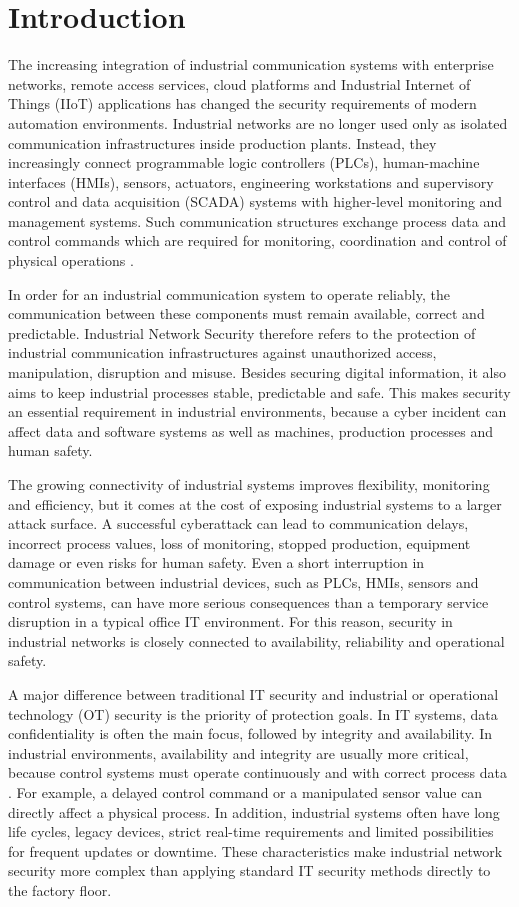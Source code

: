 \documentclass[conference]{IEEEtran}
\begin{document}
\section{Introduction}
The increasing integration of industrial communication systems with enterprise networks, remote access services, cloud platforms and Industrial Internet of Things (IIoT) applications has changed the security requirements of modern automation environments. Industrial networks are no longer used only as isolated communication infrastructures inside production plants. Instead, they increasingly connect programmable logic controllers (PLCs), human-machine interfaces (HMIs), sensors, actuators, engineering workstations and supervisory control and data acquisition (SCADA) systems with higher-level monitoring and management systems. Such communication structures exchange process data and control commands which are required for monitoring, coordination and control of physical operations \cite{b1}. 

In order for an industrial communication system to operate reliably, the communication between these components must remain available, correct and predictable. Industrial Network Security therefore refers to the protection of industrial communication infrastructures against unauthorized access, manipulation, disruption and misuse. Besides securing digital information, it also aims to keep industrial processes stable, predictable and safe. This makes security an essential requirement in industrial environments, because a cyber incident can affect data and software systems as well as machines, production processes and human safety. 

The growing connectivity of industrial systems improves flexibility, monitoring and efficiency, but it comes at the cost of exposing industrial systems to a larger attack surface. A successful cyberattack can lead to communication delays, incorrect process values, loss of monitoring, stopped production, equipment damage or even risks for human safety. Even a short interruption in communication between industrial devices, such as PLCs, HMIs, sensors and control systems, can have more serious consequences than a temporary service disruption in a typical office IT environment. For this reason, security in industrial networks is closely connected to availability, reliability and operational safety. 

A major difference between traditional IT security and industrial or operational technology (OT) security is the priority of protection goals. In IT systems, data confidentiality is often the main focus, followed by integrity and availability. In industrial environments, availability and integrity are usually more critical, because control systems must operate continuously and with correct process data \cite{b1}. For example, a delayed control command or a manipulated sensor value can directly affect a physical process. In addition, industrial systems often have long life cycles, legacy devices, strict real-time requirements and limited possibilities for frequent updates or downtime. These characteristics make industrial network security more complex than applying standard IT security methods directly to the factory floor. 
\end{document}
